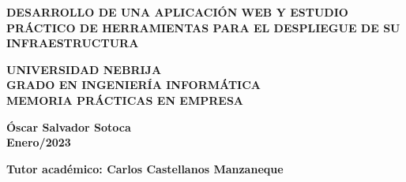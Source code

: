 \documentclass[11pt]{article}
\begin{document}
		\begin{titlepage}
		{\color{white}{.}}
		\linebreak
		\linebreak
		
		\centering
		\linebreak
		\vspace{3cm}
		
		{\LARGE\textbf{\color{RojoNebrija}DESARROLLO DE UNA APLICACIÓN WEB Y ESTUDIO PRÁCTICO DE HERRAMIENTAS PARA EL DESPLIEGUE DE SU INFRAESTRUCTURA}\par}
		\vspace{2cm}
		
		{\Large \textbf{\color{black}UNIVERSIDAD NEBRIJA \\ GRADO EN INGENIERÍA INFORMÁTICA \\ MEMORIA PRÁCTICAS EN EMPRESA}\par}
		\vspace{2cm}
		

		{\Large \textbf{ Óscar Salvador Sotoca\\ Enero/2023}\par}
		\vspace{2cm}

		{\Large \textbf{Tutor académico: Carlos Castellanos Manzaneque}\par}
		\vspace{2cm}
						
	\end{titlepage}


\tableofcontents

\clearpage
\listoffigures

\vspace{1cm}
\renewcommand{\listtablename}{Índice de tablas}
\renewcommand{\tablename}{Tabla} 
\listoftables

\clearpage
\printnoidxglossary[type=\acronymtype, sort=standard, style=mcolindex , title=Acrónimos]

\clearpage
\setlength{\glsdescwidth}{.7\linewidth}
\printnoidxglossary[sort=standard, style=long3col]
\end{document}
